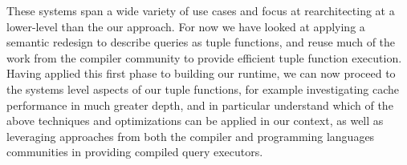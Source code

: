 These systems span a wide variety of use cases and focus at rearchitecting at a
lower-level than the our approach. For now we have looked at applying a semantic
redesign to describe queries as tuple functions, and reuse much of the work from
the compiler community to provide efficient tuple function execution. Having
applied this first phase to building our runtime, we can now proceed to the
systems level aspects of our tuple functions, for example investigating cache
performance in much greater depth, and in particular understand which of the
above techniques and optimizations can be applied in our context, as well as
leveraging approaches from both the compiler and programming languages
communities in providing compiled query executors.

